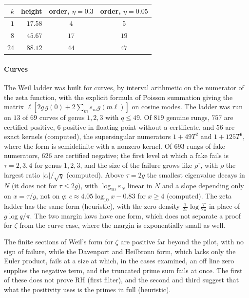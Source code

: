 \begin{center}\small
\begin{tabular}{rrcc}
\toprule
$k$ & height & order, $\eta=0.3$ & order, $\eta=0.05$\\
\midrule
$1$ & $17.58$ & $4$ & $5$\\
$8$ & $45.67$ & $17$ & $19$\\
$24$ & $88.12$ & $44$ & $47$\\
\bottomrule
\end{tabular}
\end{center}

\paragraph{Curves} The Weil ladder was built for curves, by interval arithmetic on the numerator of the zeta function, with the explicit formula of Poisson summation giving the matrix $\ell[2g\,g(0)+2\sum_ms_mg(m\ell)]$ on cosine modes. The ladder was run on $13$ of $69$ curves of genus $1,2,3$ with $q\le49$. Of $819$ genuine rungs, $757$ are certified positive, $6$ positive in floating point without a certificate, and $56$ are exact kernels (computed), the supersingular numerators $1+49T^2$ and $1+125T^6$, where the form is semidefinite with a nonzero kernel. Of $693$ rungs of fake numerators, $626$ are certified negative; the first level at which a fake fails is $\tau=2,3,4$ for genus $1,2,3$, and the size of the failure grows like $\rho^\tau$, with $\rho$ the largest ratio $|\alpha|/\sqrt q$ (computed). Above $\tau=2g$ the smallest eigenvalue decays in $N$ (it does not for $\tau\le2g$), with $\log_{10}\varepsilon_N$ linear in $N$ and a slope depending only on $x=\tau/g$, not on $q$: $c\approx4.05\log_{10}x-0.83$ for $x\ge4$ (computed). The zeta ladder has the same form (heuristic), with the zero density $\frac1{2\pi}\log\frac T{2\pi}$ in place of $g\log q/\pi$. The two margin laws have one form, which does not separate a proof for $\zeta$ from the curve case, where the margin is exponentially small as well.

The finite sections of Weil's form for $\zeta$ are positive far beyond the pilot, with no sign of failure, while the Davenport and Heilbronn form, which lacks only the Euler product, fails at a size at which, in the cases examined, an off line zero supplies the negative term, and the truncated prime sum fails at once. The first of these does not prove RH (first filter), and the second and third suggest that what the positivity uses is the primes in full (heuristic).

